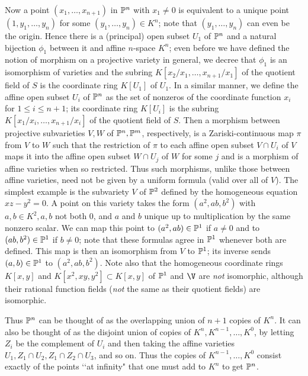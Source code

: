 Now a point $(x_1,\ldots,x_{n+1})$ in $\Bbb P^n$ with $x_1\ne0$ is equivalent to a unique point
$(1,y_1,\ldots,y_n)$ for some $(y_1,\ldots,y_n)\in K^n$; note that $(y_1,\ldots,y_n)$ can even be the origin.  Hence there is a (principal) open subset $U_1$ of $\Bbb P^n$ and a natural bijection
$\phi_1$ between it and affine $n$-space $K^n$; even before we have defined the notion of morphism on a projective variety in general, we decree that $\phi_1$ is an isomorphism of varieties and the subring $K[x_2/x_1,\ldots,x_{n+1}/x_1]$ of the quotient field of $S$ is the coordinate ring $K[U_1]$ of $U_1$.  In a similar manner, we define the affine open subset $U_i$ of $\Bbb P^n$ as the set of nonzeros of the coordinate function $x_i$ for $1\le i\le n+1$; its coordinate ring $K[U_i]$ is the subring $K[x_1/x_i,\ldots,x_{n+1}/x_i]$ of the quotient field of $S$.  Then a morphism between projective subvarieties $V,W$ of $\Bbb P^n,\Bbb P^m$, respectively, is a Zariski-continuous map $\pi$ from $V$ to $W$ such that the restriction of $\pi$ to each affine open subset $V\cap U_i$ of $V$ maps it into the affine open subset $W\cap U_j$ of $W$ for some $j$ and is a morphism of affine varieties when so restricted.  Thus such morphisms, unlike those between affine varieties, need not be given by a uniform formula (valid over all of $V$).  The simplest example is the subvariety $V$ of
$\Bbb P^2$ defined by the homogeneous equation $xz - y^2 = 0$.  A point on this variety takes the form $(a^2,ab,b^2)$ with $a,b\in K^2, a,b$ not both 0, and $a$ and $b$ unique up to multiplication by the same nonzero scalar.  We can map this point to $(a^2,ab)\in\Bbb P^1$ if $a\ne0$ and to
$(ab,b^2)\in\Bbb P^1$ if $b\ne0$; note that these formulas agree in $\Bbb P^1$ whenever both are defined.  This map is then an isomorphism from $V$ to $\Bbb P^1$; its inverse sends
$(a,b)\in\Bbb P^1$ to $(a^2,ab,b^2)$.   Note also that the homogeneous coordinate rings $K[x,y]$ and $K[x^2,xy,y^2]\subset K[x,y]$ of $\Bbb P^1$ and $\V$ are {\sl not} isomorphic, although their rational function fields ({\sl not} the same as their quotient fields) are isomorphic.

Thus $\Bbb P^n$ can be thought of as the overlapping union of $n+1$ copies of $K^n$.  It can also be thought of as the disjoint union of copies of $K^n,K^{n-1},\ldots,K^0$, by letting $Z_i$ be the complement of $U_i$ and then taking the affine varieties $U_1,Z_1\cap U_2, Z_1\cap Z_2\cap U_3$, and so on.  Thus the copies of $K^{n-1},\ldots,K^0$ consist exactly of the points \lq\lq at infinity" that one must add to $K^n$ to get $\Bbb P^n$.